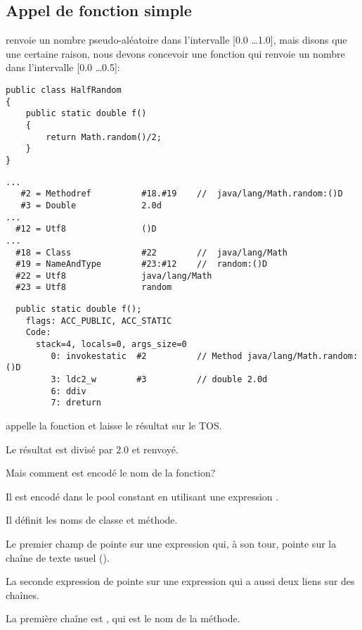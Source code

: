 \subsection{Appel de fonction simple}

 renvoie un nombre pseudo-aléatoire dans l'intervalle [0.0 \dots 1.0],
mais disons que une certaine raison, nous devons concevoir une fonction qui renvoie
un nombre dans l'intervalle [0.0 \dots 0.5]:


\begin{lstlisting}[style=customjava]
public class HalfRandom
{ 
	public static double f()
	{
		return Math.random()/2;
	}
}
\end{lstlisting}

\begin{lstlisting}[caption=Constant pool]
...
   #2 = Methodref          #18.#19    //  java/lang/Math.random:()D
   #3 = Double             2.0d
...
  #12 = Utf8               ()D
...
  #18 = Class              #22        //  java/lang/Math
  #19 = NameAndType        #23:#12    //  random:()D
  #22 = Utf8               java/lang/Math
  #23 = Utf8               random
\end{lstlisting}

\begin{lstlisting}
  public static double f();
    flags: ACC_PUBLIC, ACC_STATIC
    Code:
      stack=4, locals=0, args_size=0
         0: invokestatic  #2          // Method java/lang/Math.random:()D
         3: ldc2_w        #3          // double 2.0d
         6: ddiv
         7: dreturn
\end{lstlisting}

 appelle la fonction  et laisse le résultat sur
le \ac{TOS}.

Le résultat est divisé par 2.0 et renvoyé.

Mais comment est encodé le nom de la fonction?

Il est encodé dans le pool constant en utilisant une expression .

Il définit les noms de classe et méthode.

Le premier champ de  pointe sur une expression  qui, à son
tour, pointe sur la chaîne de texte usuel ().

La seconde expression de  pointe sur une expression 
qui a aussi deux liens sur des chaînes.

La première chaîne est , qui est le nom de la méthode.

